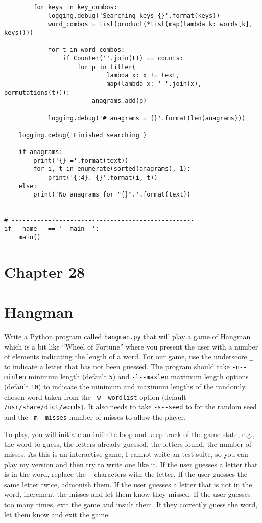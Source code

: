 \documentclass[]{article}
\begin{document}
\begin{verbatim}
        for keys in key_combos:
            logging.debug('Searching keys {}'.format(keys))
            word_combos = list(product(*list(map(lambda k: words[k], keys))))

            for t in word_combos:
                if Counter(''.join(t)) == counts:
                    for p in filter(
                            lambda x: x != text,
                            map(lambda x: ' '.join(x), permutations(t))):
                        anagrams.add(p)

            logging.debug('# anagrams = {}'.format(len(anagrams)))

    logging.debug('Finished searching')

    if anagrams:
        print('{} ='.format(text))
        for i, t in enumerate(sorted(anagrams), 1):
            print('{:4}. {}'.format(i, t))
    else:
        print('No anagrams for "{}".'.format(text))


# --------------------------------------------------
if __name__ == '__main__':
    main()
\end{verbatim}

\pagebreak

\hypertarget{chapter-28}{%
\section{Chapter 28}\label{chapter-28}}

\hypertarget{hangman}{%
\section{Hangman}\label{hangman}}

Write a Python program called \texttt{hangman.py} that will play a game
of Hangman which is a bit like ``Wheel of Fortune'' where you present
the user with a number of elements indicating the length of a word. For
our game, use the underscore \texttt{\_} to indicate a letter that has
not been guessed. The program should take
\texttt{-n\textbar{}-\/-minlen} minimum length (default \texttt{5}) and
\texttt{-l\textbar{}-\/-maxlen} maximum length options (default
\texttt{10}) to indicate the minimum and maximum lengths of the randomly
chosen word taken from the \texttt{-w\textbar{}-\/-wordlist} option
(default \texttt{/usr/share/dict/words}). It also needs to take
\texttt{-s\textbar{}-\/-seed} to for the random seed and the
\texttt{-m\textbar{}-\/-misses} number of misses to allow the player.

To play, you will initiate an inifinite loop and keep track of the game
state, e.g., the word to guess, the letters already guessed, the letters
found, the number of misses. As this is an interactive game, I cannot
write an test suite, so you can play my version and then try to write
one like it. If the user guesses a letter that is in the word, replace
the \texttt{\_} characters with the letter. If the user guesses the same
letter twice, admonish them. If the user guesses a letter that is not in
the word, increment the misses and let them know they missed. If the
user guesses too many times, exit the game and insult them. If they
correctly guess the word, let them know and exit the game.
\end{document}
